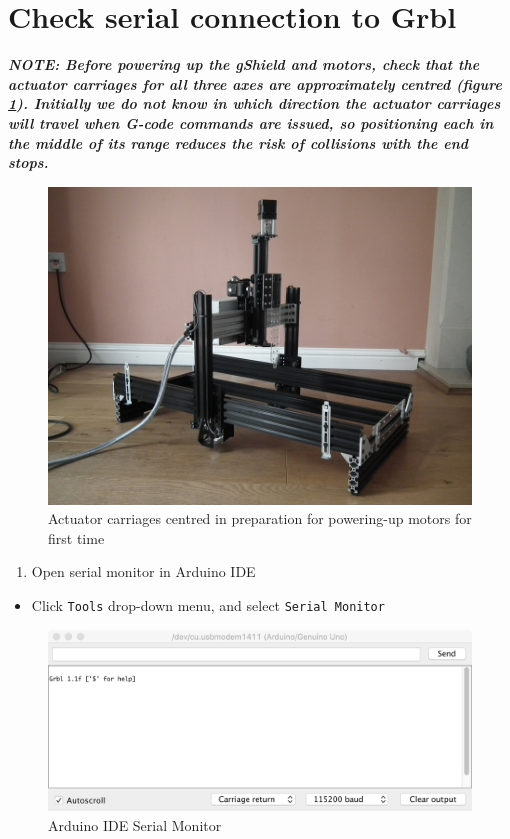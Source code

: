 \documentclass[]{book}
\providecommand{\tightlist}{%
  \setlength{\itemsep}{0pt}\setlength{\parskip}{0pt}}
\theoremstyle{definition}
\theoremstyle{definition}
\theoremstyle{remark}
\begin{document}
\section{Check serial connection to
Grbl}\label{check-serial-connection-to-grbl}

\emph{\textbf{NOTE: Before powering up the gShield and motors, check
that the actuator carriages for all three axes are approximately centred
(figure \ref{fig:actuatorsCentred}). Initially we do not know in which
direction the actuator carriages will travel when G-code commands are
issued, so positioning each in the middle of its range reduces the risk
of collisions with the end stops.}}

\begin{figure}

{\centering \includegraphics[width=0.75\linewidth]{images/actuator_carriages_centred} 

}

\caption{Actuator carriages centred in preparation for powering-up motors for first time}\label{fig:actuatorsCentred}
\end{figure}

\begin{enumerate}
\def\labelenumi{\arabic{enumi}.}
\tightlist
\item
  Open serial monitor in Arduino IDE
\end{enumerate}

\begin{itemize}
\tightlist
\item
  Click \texttt{Tools} drop-down menu, and select
  \texttt{Serial\ Monitor}
\end{itemize}

\begin{figure}

{\centering \includegraphics[width=0.75\linewidth]{images/Arduino_IDE_serial_monitor} 

}

\caption{Arduino IDE Serial Monitor}\label{fig:serialMonitor}
\end{figure}
\end{document}
